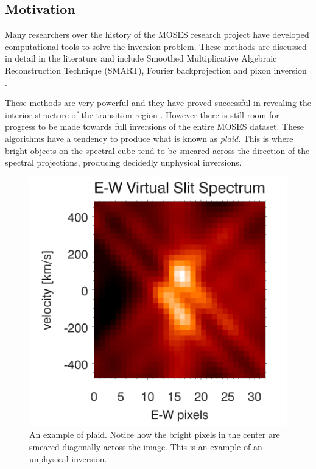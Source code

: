 \documentclass[twoside]{article}
\begin{document}
\begin{multicols}{2}
\section{Motivation}

Many researchers over the history of the MOSES research project have developed computational tools to solve the inversion problem. These methods are discussed in detail in the literature and include Smoothed Multiplicative Algebraic Reconstruction Technique (SMART)\cite{smart}, Fourier backprojection and pixon inversion \cite{inversion}. 
\par These methods are very powerful and they have proved successful in revealing the interior structure of the transition region \cite{moses}. However there is still room for progress to be made towards full inversions of the entire MOSES dataset. These algorithms have a tendency to produce what is known as \textit{plaid}. This is where bright objects on the spectral cube tend to be smeared across the direction of the spectral projections, producing decidedly unphysical inversions.

\begin{figure}[H]
	\includegraphics[width=\linewidth]{images/plaid2}
	\caption{An example of plaid. Notice how the bright pixels in the center are smeared diagonally across the image. This is an example of an unphysical inversion. \cite{tom} }
\end{figure} 


\end{multicols}
\end{document}
